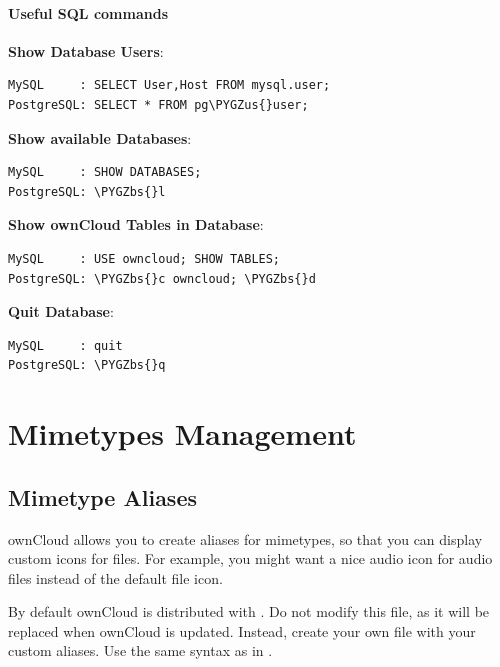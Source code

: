 \documentclass[letterpaper,10pt,english]{sphinxmanual}
\def\PYGZbs{\char`\\}
\def\PYGZus{\char`\_}
\begin{document}
\subsubsection{Useful SQL commands}
\label{configuration_database/linux_database_configuration:useful-sql-commands}
\textbf{Show Database Users}:

\begin{Verbatim}[commandchars=\\\{\}]
MySQL     : SELECT User,Host FROM mysql.user;
PostgreSQL: SELECT * FROM pg\PYGZus{}user;
\end{Verbatim}

\textbf{Show available Databases}:

\begin{Verbatim}[commandchars=\\\{\}]
MySQL     : SHOW DATABASES;
PostgreSQL: \PYGZbs{}l
\end{Verbatim}

\textbf{Show ownCloud Tables in Database}:

\begin{Verbatim}[commandchars=\\\{\}]
MySQL     : USE owncloud; SHOW TABLES;
PostgreSQL: \PYGZbs{}c owncloud; \PYGZbs{}d
\end{Verbatim}

\textbf{Quit Database}:

\begin{Verbatim}[commandchars=\\\{\}]
MySQL     : quit
PostgreSQL: \PYGZbs{}q
\end{Verbatim}


\chapter{Mimetypes Management}
\label{configuration_mimetypes/index:mimetypes-management}\label{configuration_mimetypes/index::doc}

\section{Mimetype Aliases}
\label{configuration_mimetypes/mimetype_aliases::doc}\label{configuration_mimetypes/mimetype_aliases:mimetype-aliases}
ownCloud allows you to create aliases for mimetypes, so that you can display
custom icons for files. For example, you might want a nice audio icon for audio
files instead of the default file icon.

By default ownCloud is distributed with
.
Do not modify this file, as it will be replaced when ownCloud is updated.
Instead, create your own 
file with your custom aliases. Use the same syntax as in
.
\end{document}
